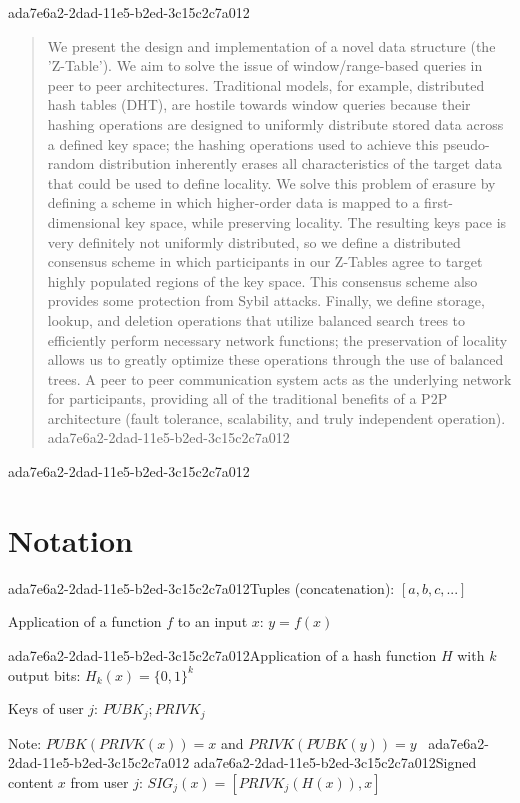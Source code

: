 \documentclass[12pt]{article}
\begin{document}
ada7e6a2-2dad-11e5-b2ed-3c15c2c7a012
\maketitle

\begin{abstract}
We present the design and implementation of a novel data structure (the 'Z-Table'). We aim to solve the issue of window/range-based queries in peer to peer architectures. Traditional models, for example,  distributed hash tables (DHT), are hostile towards window queries because their hashing operations are designed to uniformly distribute stored data across a defined key space; the hashing operations used to achieve this pseudo-random distribution inherently erases all characteristics of the target data that could be used to define locality. We solve this problem of erasure by defining a scheme in which higher-order data is mapped to a first-dimensional key space, while preserving locality. The resulting keys pace is very definitely not uniformly distributed, so we define a distributed consensus scheme in which participants in our Z-Tables agree to target highly populated regions of the key space. This consensus scheme also provides some protection from Sybil attacks. Finally, we define storage, lookup, and deletion operations that utilize balanced search trees to efficiently perform necessary network functions; the preservation of locality allows us to greatly optimize these operations through the use of balanced trees. A peer to peer communication system acts as the underlying network for participants, providing all of the traditional benefits of a P2P architecture (fault tolerance, scalability, and truly independent operation).
ada7e6a2-2dad-11e5-b2ed-3c15c2c7a012\end{abstract}
ada7e6a2-2dad-11e5-b2ed-3c15c2c7a012
\section{Notation}

ada7e6a2-2dad-11e5-b2ed-3c15c2c7a012Tuples (concatenation): $[a,b,c,...]$

Application of a function $f$ to an input $x$: $y=f(x)$

ada7e6a2-2dad-11e5-b2ed-3c15c2c7a012Application of a hash function $H$ with $k$ output bits: $H_{k}(x) = \{0,1\}^k$

Keys of user $j$: $ PUBK_j; PRIVK_j $

Note: $PUBK(PRIVK(x)) = x$ and $PRIVK(PUBK(y)) = y$~
ada7e6a2-2dad-11e5-b2ed-3c15c2c7a012
ada7e6a2-2dad-11e5-b2ed-3c15c2c7a012Signed content $x$ from user $j$: $SIG_j(x) = \left[ PRIVK_j( H(x) ), x \right]$
\end{document}

